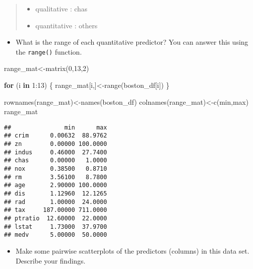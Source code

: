 \documentclass[
]{article}
\newenvironment{Shaded}{\begin{snugshade}}{\end{snugshade}}
\newcommand{\ControlFlowTok}[1]{\textcolor[rgb]{0.13,0.29,0.53}{\textbf{#1}}}
\newcommand{\DecValTok}[1]{\textcolor[rgb]{0.00,0.00,0.81}{#1}}
\newcommand{\FunctionTok}[1]{\textcolor[rgb]{0.00,0.00,0.00}{#1}}
\newcommand{\NormalTok}[1]{#1}
\newcommand{\OtherTok}[1]{\textcolor[rgb]{0.56,0.35,0.01}{#1}}
\newcommand{\SpecialCharTok}[1]{\textcolor[rgb]{0.00,0.00,0.00}{#1}}
\newcommand{\StringTok}[1]{\textcolor[rgb]{0.31,0.60,0.02}{#1}}
\providecommand{\tightlist}{%
  \setlength{\itemsep}{0pt}\setlength{\parskip}{0pt}}
\begin{document}
\begin{quote}
\begin{itemize}
\tightlist
\item
  qualitative : chas
\item
  quantitative : others
\end{itemize}
\end{quote}

\begin{itemize}
\tightlist
\item
  What is the range of each quantitative predictor? You can answer this
  using the \texttt{range()} function.
\end{itemize}

\begin{Shaded}
\begin{Highlighting}[]
\NormalTok{range\_mat}\OtherTok{\textless{}{-}}\FunctionTok{matrix}\NormalTok{(}\DecValTok{0}\NormalTok{,}\DecValTok{13}\NormalTok{,}\DecValTok{2}\NormalTok{)}

\ControlFlowTok{for}\NormalTok{ (i }\ControlFlowTok{in} \DecValTok{1}\SpecialCharTok{:}\DecValTok{13}\NormalTok{) \{}
\NormalTok{  range\_mat[i,]}\OtherTok{\textless{}{-}}\FunctionTok{range}\NormalTok{(boston\_df[i])}
\NormalTok{\}}

\FunctionTok{rownames}\NormalTok{(range\_mat)}\OtherTok{\textless{}{-}}\FunctionTok{names}\NormalTok{(boston\_df)}
\FunctionTok{colnames}\NormalTok{(range\_mat)}\OtherTok{\textless{}{-}}\FunctionTok{c}\NormalTok{(}\StringTok{\textquotesingle{}min\textquotesingle{}}\NormalTok{,}\StringTok{\textquotesingle{}max\textquotesingle{}}\NormalTok{)}
\NormalTok{range\_mat}
\end{Highlighting}
\end{Shaded}

\begin{verbatim}
##               min      max
## crim      0.00632  88.9762
## zn        0.00000 100.0000
## indus     0.46000  27.7400
## chas      0.00000   1.0000
## nox       0.38500   0.8710
## rm        3.56100   8.7800
## age       2.90000 100.0000
## dis       1.12960  12.1265
## rad       1.00000  24.0000
## tax     187.00000 711.0000
## ptratio  12.60000  22.0000
## lstat     1.73000  37.9700
## medv      5.00000  50.0000
\end{verbatim}

\begin{itemize}
\tightlist
\item
  Make some pairwise scatterplots of the predictors (columns) in this
  data set. Describe your findings.
\end{itemize}
\end{document}
